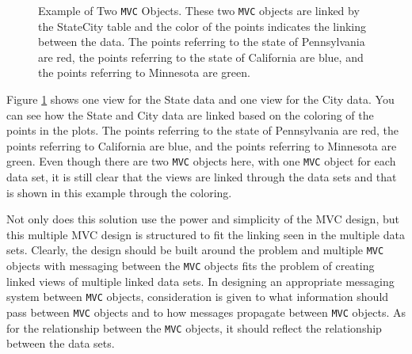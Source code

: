 \documentclass{article}[11pt]
\newcommand{\Robject}[1]{{\texttt{#1}}}
\begin{document}
\begin{figure}[ht]
  \begin{center}
    \caption{ Example of Two \Robject{MVC} Objects.  These two \Robject{MVC}
      objects are linked by the StateCity table and the color of the points
    indicates the linking between the data.  The points referring to the state
    of Pennsylvania are red, the points referring to the state of California
    are blue, and the points referring to Minnesota are green. }
    \label{Fig:MultMVC}
  \end{center}
\end{figure}

Figure \ref{Fig:MultMVC} shows one view for the State data and one view
for the City data.  You can see how the State and City data are linked based
on the coloring of the points in the plots.  The points referring to the state
of Pennsylvania are red, the points referring to California are blue, and the
points referring to Minnesota are green.  Even though there are two
\Robject{MVC} objects here, with one \Robject{MVC} object for each data set,
it is still clear that the views are linked through the data sets and that is
shown in this example through the coloring.

Not only does this solution use the power and simplicity of the MVC design, but
this multiple MVC design is structured to fit the linking seen in the multiple
data sets.  Clearly, the design should be built around the problem and
multiple \Robject{MVC} objects with messaging between the \Robject{MVC}
objects fits the problem of creating linked views of multiple linked data
sets.  In designing an appropriate messaging system between \Robject{MVC}
objects, consideration is given to what information should pass between
\Robject{MVC} objects and to how messages propagate between \Robject{MVC}
objects.  As for the relationship between the \Robject{MVC} objects, it should
reflect the relationship between the data sets. 
\end{document}
